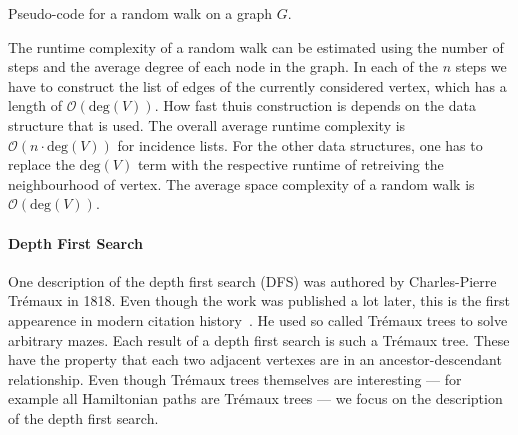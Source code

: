             \begin{algorithm}[htp]
                \hrulealg
            \caption{Pseudo-code for a random walk on a graph $G$.}\label{random_walk}
            \end{algorithm}
            
            The runtime complexity of a random walk can be estimated using the number of steps and the average degree of each node in the graph. In each of the $n$ steps we have to construct the list of edges of the currently considered vertex, which has a length of $\mathcal{O}(\text{deg}(V))$. How fast thuis construction is depends on the data structure that is used. The overall average runtime complexity is $\mathcal{O}(n \cdot \text{deg}(V))$ for incidence lists. For the other data structures, one has to replace the $\text{deg}(V)$ term with the respective runtime of retreiving the neighbourhood of vertex. The average space complexity of a random walk is $\mathcal{O}(\text{deg}(V))$. \\

        \paragraph{Depth First Search}
        One description of the depth first search (DFS) was authored by Charles-Pierre Trémaux in 1818. Even though the work was published a lot later, this is the first appearence in modern citation history~\autocite{lucas1891recreations}. He used so called Trémaux trees to solve arbitrary mazes. Each result of a depth first search is such a Trémaux tree. These have the property that each two adjacent vertexes are in an ancestor-descendant relationship. Even though Trémaux trees themselves are interesting --- for example all Hamiltonian paths are Trémaux trees --- we focus on the description of the depth first search. \\
        

